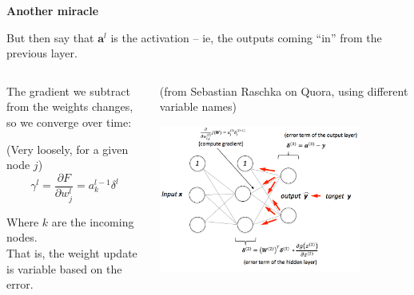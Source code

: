 \documentclass{beamer}
\newcommand{\pagestepalt}[2]{
  \begin{frame}[t]
    \begin{minipage}[t][0.26\textheight][t]{\textwidth}
      \begin{center}
        \huge
        \textbf{#1}
      \end{center}
    \end{minipage}
    
    \begin{minipage}[t][0.7\textheight][c]{\textwidth}
      #2
    \end{minipage}
  \end{frame}
}
\begin{document}
\pagestepalt{Another miracle}{
  But then say that $\mathbf{a}^l$ is the \alert{activation} -- ie, the outputs coming ``in'' from the
  previous layer.\pause\\
  \begin{columns}
    \begin{column}{0.49\textwidth}
      The gradient we subtract from the weights changes, so we converge over time:
      \begin{block}{(Very loosely, for a given node $j$)}
        \[\gamma^l = \frac{\partial F}{\partial w^l_j} = {a}^{l-1}_k \delta^l\]
      \end{block}      
      Where $k$ are the incoming nodes.\pause\\
      That is, the weight update is
      variable based on the error.\pause
    \end{column}
    \begin{column}{0.49\textwidth}
      (from Sebastian Raschka on Quora, using different variable names)
      \begin{center}
        \includegraphics[width=0.8\textwidth]{backprop.png}
      \end{center}
    \end{column}
  \end{columns}
}
\end{document}
